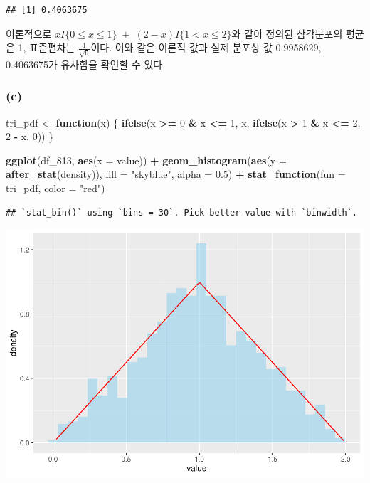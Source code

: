 \documentclass[
]{article}
\newenvironment{Shaded}{\begin{snugshade}}{\end{snugshade}}
\newcommand{\AttributeTok}[1]{\textcolor[rgb]{0.13,0.29,0.53}{#1}}
\newcommand{\ControlFlowTok}[1]{\textcolor[rgb]{0.13,0.29,0.53}{\textbf{#1}}}
\newcommand{\DecValTok}[1]{\textcolor[rgb]{0.00,0.00,0.81}{#1}}
\newcommand{\FloatTok}[1]{\textcolor[rgb]{0.00,0.00,0.81}{#1}}
\newcommand{\FunctionTok}[1]{\textcolor[rgb]{0.13,0.29,0.53}{\textbf{#1}}}
\newcommand{\NormalTok}[1]{#1}
\newcommand{\OtherTok}[1]{\textcolor[rgb]{0.56,0.35,0.01}{#1}}
\newcommand{\SpecialCharTok}[1]{\textcolor[rgb]{0.81,0.36,0.00}{\textbf{#1}}}
\newcommand{\StringTok}[1]{\textcolor[rgb]{0.31,0.60,0.02}{#1}}
\begin{document}
\begin{verbatim}
## [1] 0.4063675
\end{verbatim}

이론적으로 \(xI\{0\leq x \leq 1\} \; + \; (2-x)I\{1 < x \leq 2\}\)와
같이 정의된 삼각분포의 평균은 1, 표준편차는 \(\frac{1}{\sqrt6}\)이다.
이와 같은 이론적 값과 실제 분포상 값 0.9958629, 0.4063675가 유사함을
확인할 수 있다.

\subsubsection{(c)}\label{c-2}

\begin{Shaded}
\begin{Highlighting}[]
\NormalTok{tri\_pdf }\OtherTok{\textless{}{-}} \ControlFlowTok{function}\NormalTok{(x) \{}
  \FunctionTok{ifelse}\NormalTok{(x }\SpecialCharTok{\textgreater{}=} \DecValTok{0} \SpecialCharTok{\&}\NormalTok{ x }\SpecialCharTok{\textless{}=} \DecValTok{1}\NormalTok{, x,}
         \FunctionTok{ifelse}\NormalTok{(x }\SpecialCharTok{\textgreater{}} \DecValTok{1} \SpecialCharTok{\&}\NormalTok{ x }\SpecialCharTok{\textless{}=} \DecValTok{2}\NormalTok{, }\DecValTok{2} \SpecialCharTok{{-}}\NormalTok{ x, }\DecValTok{0}\NormalTok{))}
\NormalTok{\}}

\FunctionTok{ggplot}\NormalTok{(df\_813, }\FunctionTok{aes}\NormalTok{(}\AttributeTok{x =}\NormalTok{ value)) }\SpecialCharTok{+}
  \FunctionTok{geom\_histogram}\NormalTok{(}\FunctionTok{aes}\NormalTok{(}\AttributeTok{y =} \FunctionTok{after\_stat}\NormalTok{(density)), }\AttributeTok{fill =} \StringTok{"skyblue"}\NormalTok{, }\AttributeTok{alpha =} \FloatTok{0.5}\NormalTok{) }\SpecialCharTok{+}
  \FunctionTok{stat\_function}\NormalTok{(}\AttributeTok{fun =}\NormalTok{ tri\_pdf, }\AttributeTok{color =} \StringTok{"red"}\NormalTok{)}
\end{Highlighting}
\end{Shaded}

\begin{verbatim}
## `stat_bin()` using `bins = 30`. Pick better value with `binwidth`.
\end{verbatim}

\includegraphics{Bayes_stat_hw2_files/figure-latex/unnamed-chunk-15-1.pdf}
\end{document}
